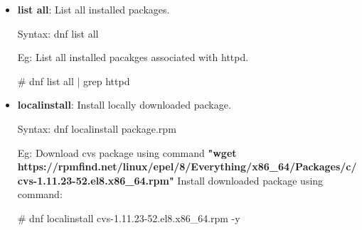 \begin{flushleft}
\begin{itemize}
		
		\item \textbf{list all}: List all installed packages.
		\begin{tcolorbox}[breakable,notitle,boxrule=-0pt,colback=pink,colframe=pink]
			\color{black}
			\font=9pt
			Syntax: dnf list all
			\font=4pt
		\end{tcolorbox}
		Eg: List all installed pacakges associated with httpd.
		\begin{tcolorbox}[breakable,notitle,boxrule=-0pt,colback=black,colframe=black]
			\color{green}
			\font=9pt
			\# dnf list all | grep httpd
			\font=4pt
		\end{tcolorbox}
		\bigskip
		\bigskip					

		\item \textbf{localinstall}: Install locally downloaded package.
		\begin{tcolorbox}[breakable,notitle,boxrule=-0pt,colback=pink,colframe=pink]
			\color{black}
			\font=9pt
			Syntax: dnf localinstall package.rpm
			\font=4pt
		\end{tcolorbox}
		Eg: Download cvs package using command \textbf{"wget https://rpmfind.net/linux/epel/8/Everything/x86\_64/Packages/c/cvs-1.11.23-52.el8.x86\_64.rpm"}
		\newline
		Install downloaded package using command:		
		\begin{tcolorbox}[breakable,notitle,boxrule=-0pt,colback=black,colframe=black]
			\color{green}
			\font=9pt
			\# dnf localinstall cvs-1.11.23-52.el8.x86\_64.rpm -y
			\font=4pt
		\end{tcolorbox}
		\bigskip
		\bigskip					
		
					
	\end{itemize}
	
	
\end{flushleft}
\newpage



